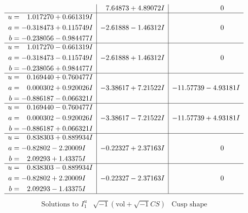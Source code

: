 \documentclass[1p]{elsarticle_modified}
\theoremstyle{definition}
\newcommand{\I}{\sqrt{-1}}
\begin{document}
$$\begin{array}{c|c|c}
 & \phantom{-}7.64873 + 4.89072 I & \phantom{-0.000000 } 0 \\ \hline\begin{aligned}
u &= \phantom{-}1.017270 + 0.661319 I \\
a &= -0.318473 + 0.115749 I \\
b &= -0.238056 - 0.984477 I\end{aligned}
 & -2.61888 - 1.46312 I & \phantom{-0.000000 } 0 \\ \hline\begin{aligned}
u &= \phantom{-}1.017270 - 0.661319 I \\
a &= -0.318473 - 0.115749 I \\
b &= -0.238056 + 0.984477 I\end{aligned}
 & -2.61888 + 1.46312 I & \phantom{-0.000000 } 0 \\ \hline\begin{aligned}
u &= \phantom{-}0.169440 + 0.760477 I \\
a &= \phantom{-}0.000302 + 0.920026 I \\
b &= -0.886187 - 0.066321 I\end{aligned}
 & -3.38617 + 7.21522 I & -11.57739 - 4.93181 I \\ \hline\begin{aligned}
u &= \phantom{-}0.169440 - 0.760477 I \\
a &= \phantom{-}0.000302 - 0.920026 I \\
b &= -0.886187 + 0.066321 I\end{aligned}
 & -3.38617 - 7.21522 I & -11.57739 + 4.93181 I \\ \hline\begin{aligned}
u &= \phantom{-}0.838303 + 0.889934 I \\
a &= -0.82802 - 2.20009 I \\
b &= \phantom{-}2.09293 + 1.43375 I\end{aligned}
 & -0.22327 + 2.37163 I & \phantom{-0.000000 } 0 \\ \hline\begin{aligned}
u &= \phantom{-}0.838303 - 0.889934 I \\
a &= -0.82802 + 2.20009 I \\
b &= \phantom{-}2.09293 - 1.43375 I\end{aligned}
 & -0.22327 - 2.37163 I & \phantom{-0.000000 } 0\\
 \hline 
 \end{array}$$\newpage$$\begin{array}{c|c|c}  
\text{Solutions to }I^u_{1}& \I (\text{vol} + \sqrt{-1}CS) & \text{Cusp shape}\\

\end{array}$$
\end{document}
